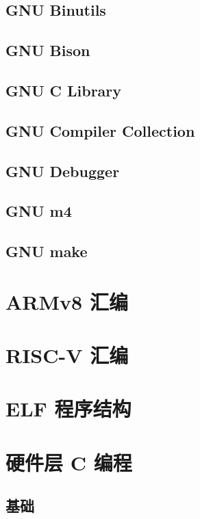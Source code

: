 \subsection{GNU Binutils}

\subsection{GNU Bison}

\subsection{GNU C Library}

\subsection{GNU Compiler Collection}

\subsection{GNU Debugger}

\subsection{GNU m4}

\subsection{GNU make}

\section{ARMv8 汇编}

\section{RISC-V 汇编}

\section{ELF 程序结构}

\section{硬件层 C 编程}
\subsection{基础}
